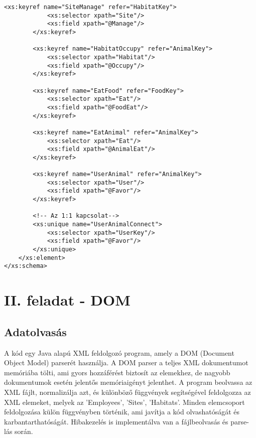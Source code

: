 \documentclass[12pt]{report}
\begin{document}
\begin{lstlisting}[caption={Az XSD dokumentum}]
		<xs:keyref name="SiteManage" refer="HabitatKey">
			<xs:selector xpath="Site"/>
			<xs:field xpath="@Manage"/>
		</xs:keyref>
		
		<xs:keyref name="HabitatOccupy" refer="AnimalKey">
			<xs:selector xpath="Habitat"/>
			<xs:field xpath="@Occupy"/>
		</xs:keyref>
		
		<xs:keyref name="EatFood" refer="FoodKey">
			<xs:selector xpath="Eat"/>
			<xs:field xpath="@FoodEat"/>
		</xs:keyref>
		
		<xs:keyref name="EatAnimal" refer="AnimalKey">
			<xs:selector xpath="Eat"/>
			<xs:field xpath="@AnimalEat"/>
		</xs:keyref>
		
		<xs:keyref name="UserAnimal" refer="AnimalKey">
			<xs:selector xpath="User"/>
			<xs:field xpath="@Favor"/>
		</xs:keyref>
		
		<!-- Az 1:1 kapcsolat-->
		<xs:unique name="UserAnimalConnect">
			<xs:selector xpath="UserKey"/>
			<xs:field xpath="@Favor"/>
		</xs:unique>
	</xs:element>
</xs:schema>
\end{lstlisting}

\chapter{II. feladat - DOM}
\section{Adatolvasás}
\indent\indent A kód egy Java alapú XML feldolgozó program, amely a DOM (Document Object Model) parserét használja. A DOM parser a teljes XML dokumentumot memóriába tölti, ami gyors hozzáférést biztosít az elemekhez, de nagyobb dokumentumok esetén jelentős memóriaigényt jelenthet. A program beolvassa az XML fájlt, normalizálja azt, és különböző függvények segítségével feldolgozza az XML elemeket, melyek az 'Employees', 'Sites', 'Habitats'. Minden elemcsoport feldolgozása külön függvényben történik, ami javítja a kód olvashatóságát és karbantarthatóságát. Hibakezelés is implementálva van a fájlbeolvasás és parse-lás során.\\
\end{document}
